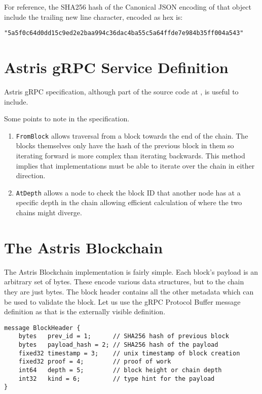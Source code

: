 For reference, the SHA256 hash of the Canonical JSON encoding of that object include the trailing new line character, encoded as hex is:

\begin{lstlisting}[style=ES6]
"5a5f0c64d0dd15c9ed2e2baa994c36dac4ba55c5a64ffde7e984b35ff004a543"
\end{lstlisting}

\chapter{Astris gRPC Service Definition}
\label{appendix:grpc}

Astris gRPC specification, although part of the source code at {\surl{\astrisrepo}}, is useful to include.



Some points to note in the specification.

\begin{enumerate}
  \item \texttt{FromBlock} allows traversal from a block towards the end of the chain. The blocks themselves only have the hash of the previous block in them so iterating forward is more complex than iterating backwards. This method implies that implementations must be able to iterate over the chain in either direction.
  \item \texttt{AtDepth} allows a node to check the block ID that another node has at a specific depth in the chain allowing efficient calculation of where the two chains might diverge.
\end{enumerate}

\chapter{The Astris Blockchain}
\label{appendix:blockchain}

The Astris Blockchain implementation is fairly simple. Each block's payload is an arbitrary set of bytes. These encode various data structures, but to the chain they are just bytes. The block header contains all the other metadata which can be used to validate the block. Let us use the gRPC Protocol Buffer message definition as that is the externally visible definition.

\begin{lstlisting}[language=protobuf3, style=protobuf]
message BlockHeader {
    bytes   prev_id = 1;      // SHA256 hash of previous block
    bytes   payload_hash = 2; // SHA256 hash of the payload
    fixed32 timestamp = 3;    // unix timestamp of block creation
    fixed32 proof = 4;        // proof of work
    int64   depth = 5;        // block height or chain depth
    int32   kind = 6;         // type hint for the payload
}
\end{lstlisting}


